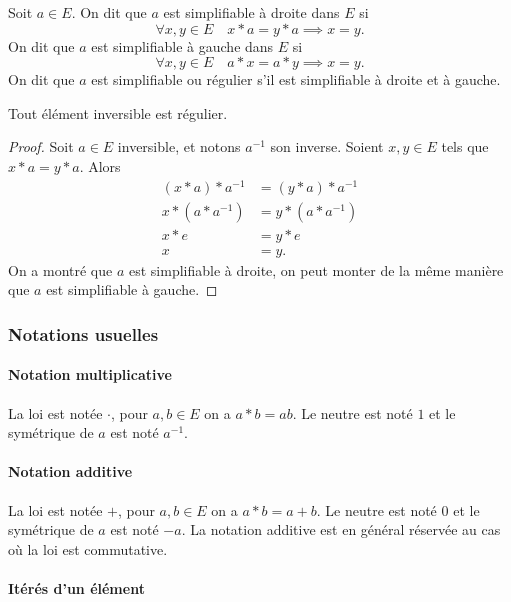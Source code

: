 \begin{defdef}
  Soit $a \in E$. On dit que $a$ est simplifiable à droite dans $E$ si
  \begin{equation}
    \forall x,y \in E \quad x*a=y*a \implies x=y.
  \end{equation}
   On dit que $a$ est simplifiable à gauche dans $E$ si
  \begin{equation}
    \forall x,y \in E \quad a*x=a*y \implies x=y.
  \end{equation}
  On dit que $a$ est simplifiable ou régulier s'il est simplifiable à droite et à gauche.
\end{defdef}
\begin{prop}
  Tout élément inversible est régulier.
\end{prop}
\begin{proof}
  Soit $a \in E$ inversible, et notons $a^{-1}$ son inverse. Soient $x,y \in E$ tels que $x*a=y*a$. Alors
  \begin{align}
    (x*a)*a^{-1}&=(y*a)*a^{-1} \\
    x*(a*a^{-1})&=y*(a*a^{-1})\\
    x*e&=y*e\\
    x&=y.
  \end{align}
On a montré que $a$ est simplifiable à droite, on peut monter de la même manière que $a$ est simplifiable à gauche.
\end{proof}

\subsubsection{Notations usuelles}
\paragraph{Notation multiplicative}
La loi est notée $\cdot$, pour $a,b \in E$ on a $a*b=ab$. Le neutre est noté $1$ et le symétrique de $a$ est noté $a^{-1}$.
\paragraph{Notation additive}
La loi est notée $+$, pour $a,b \in E$ on a $a*b=a+b$. Le neutre est noté $0$ et le symétrique de $a$ est noté $-a$. La notation additive est en général réservée au cas où la loi est commutative.
\paragraph{Itérés d'un élément}

